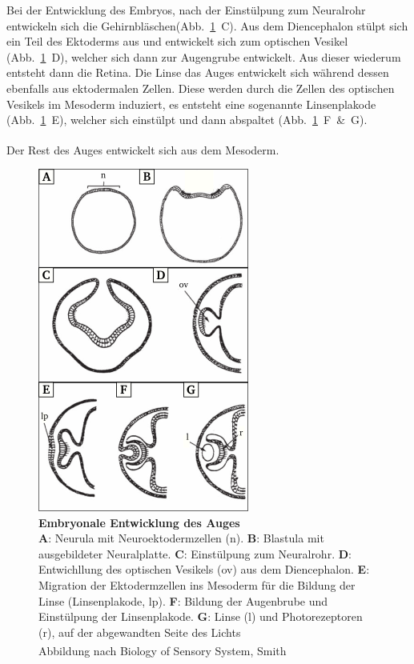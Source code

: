 \documentclass[12pt,a4paper,pdftex]{article}
\begin{document}
Bei der Entwicklung des Embryos, nach der Einstülpung zum Neuralrohr entwickeln sich die Gehirnbläschen(Abb.~\ref{fig:eye_neurulation}~C). Aus dem Diencephalon stülpt sich ein Teil des Ektoderms aus und entwickelt sich zum optischen Vesikel (Abb.~\ref{fig:eye_neurulation}~D), welcher sich dann zur Augengrube  entwickelt. Aus dieser wiederum entsteht dann die Retina. Die Linse das Auges entwickelt sich während dessen ebenfalls aus ektodermalen Zellen. Diese werden durch die Zellen des optischen Vesikels  im Mesoderm induziert, es entsteht eine sogenannte Linsenplakode  (Abb.~\ref{fig:eye_neurulation}~E), welcher sich einstülpt und dann abspaltet (Abb.~\ref{fig:eye_neurulation}~F~\&~G).

Der Rest des Auges entwickelt sich aus dem Mesoderm. \textsuperscript{\cite[16]{smith2008biology}}

\begin{figure}[H]
    \centering
    \includegraphics{pictures/visual/Eye_Neurulation.png}
    \caption[Embryonale Entwicklung des Auges]{\textbf{Embryonale Entwicklung des Auges}\\
    \textbf{A}: Neurula mit Neuroektodermzellen (n). \textbf{B}: Blastula mit ausgebildeter Neuralplatte. \textbf{C}: Einstülpung zum Neuralrohr. \textbf{D}: Entwichllung des optischen Vesikels (ov) aus dem Diencephalon. \textbf{E}: Migration der Ektodermzellen ins Mesoderm für die Bildung der Linse (Linsenplakode, lp). \textbf{F}: Bildung der Augenbrube und Einstülpung der Linsenplakode. \textbf{G}: Linse (l) und Photorezeptoren (r), auf der abgewandten Seite des Lichts\\
    Abbildung nach Biology of Sensory System, Smith \textsuperscript{\cite[16]{smith2008biology}}}
    \label{fig:eye_neurulation}
\end{figure}
\end{document}

